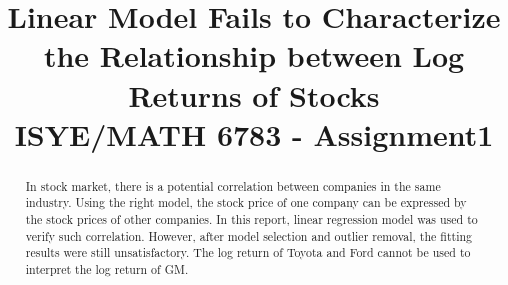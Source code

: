 \documentclass[11pt, conference]{IEEEtran}
\begin{document}
%
\title{\huge Linear Model Fails to Characterize the Relationship between Log Returns of Stocks \\ {\large ISYE/MATH 6783 - Assignment1}}


\author{
}







\maketitle

\begin{abstract}
In stock market, there is a potential correlation between companies in the same industry. Using the right model, the stock price of one company can be expressed by the stock prices of other companies. In this report, linear regression model was used to verify such correlation. However, after model selection and outlier removal, the fitting results were still unsatisfactory. The log return of Toyota and Ford cannot be used to interpret the log return of GM.
\end{abstract}

\end{document}
